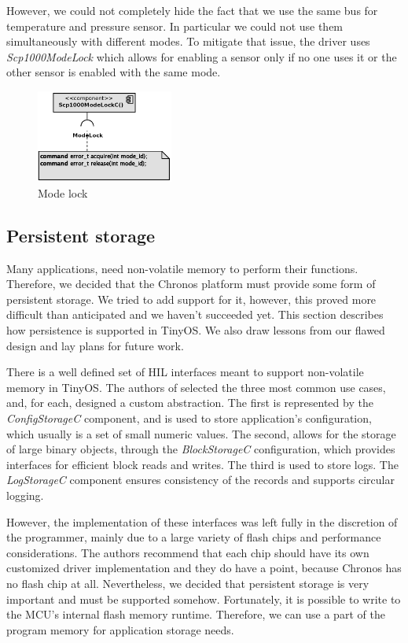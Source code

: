 However, we could not completely hide the fact that we use the same bus for temperature and pressure sensor.
In particular we could not use them simultaneously with different modes.
To mitigate that issue, the driver uses \emph{Scp1000ModeLock} which allows for enabling a sensor only if no one uses it or the other sensor is enabled with the same mode.

\begin{figure}[h]
  \centering
  \includegraphics[width=0.4\textwidth]{diagrams/scp1000_lock.eps}
  \caption{Mode lock}
  \label{fig:scp1000_lock}
\end{figure}

\subsection{Persistent storage}

Many applications, need non-volatile memory to perform their functions. Therefore, we decided that the Chronos platform must provide some form of persistent storage. We tried to add support for it, however, this proved more difficult than anticipated and we haven't succeeded yet. This section describes how persistence is supported in TinyOS. We also draw lessons from our flawed design and lay plans for future work.

There is a well defined set of HIL interfaces meant to support non-volatile memory in TinyOS. The authors of \cite{TEP103} selected the three most common use cases, and, for each, designed a custom abstraction. The first is represented by the \emph{ConfigStorageC} component, and is used to store application's configuration, which usually is a set of small numeric values. The second, allows for the storage of large binary objects, through the \emph{BlockStorageC} configuration, which provides interfaces for efficient block reads and writes. The third is used to store logs. The \emph{LogStorageC} component ensures consistency of the records and supports circular logging.

However, the implementation of these interfaces was left fully in the discretion of the programmer, mainly due to a large variety of flash chips and performance considerations. The authors recommend that each chip should have its own customized driver implementation and they do have a point, because Chronos has no flash chip at all. Nevertheless, we decided that persistent storage is very important and must be supported somehow. Fortunately, it is possible to write to the MCU's internal flash memory runtime. Therefore, we can use a part of the program memory for application storage needs.

